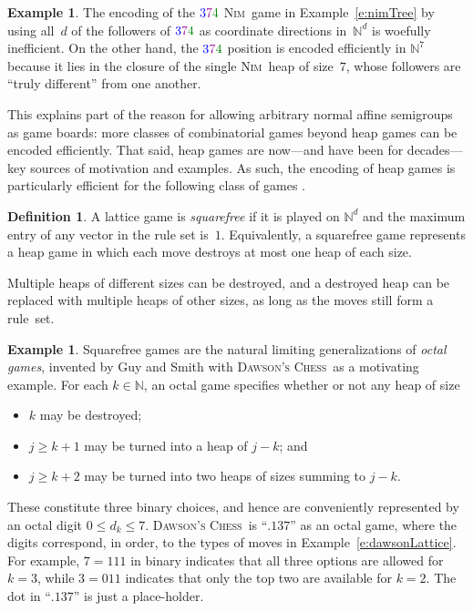\documentclass[12pt]{amsart}
\numberwithin{equation}{section}
\theoremstyle{definition}
\newtheorem{defn}[thm]{Definition}
\newtheorem{example}[thm]{Example}
\begin{document}
\begin{example}
The encoding of the
${\color{blue}3}{\color{darkpurple}7}{\color{darkgreen}4}$
{\textsc{Nim}}\ game in Example~\ref{e:nimTree} by using all~$d$ of the
followers of
${\color{blue}3}{\color{darkpurple}7}{\color{darkgreen}4}$ as
coordinate directions in~${\mathbb{N}}^d$ is woefully inefficient.  On
the other hand, the
${\color{blue}3}{\color{darkpurple}7}{\color{darkgreen}4}$
position is encoded efficiently in ${\mathbb{N}}^7$ because it lies in
the closure of the single {\textsc{Nim}}\ heap of size~$7$, whose
followers are ``truly different'' from one another.
\end{example}

This explains part of the reason for allowing arbitrary normal affine
semigroups as game boards: more classes of combinatorial games beyond
heap games can be encoded efficiently.  That said, heap games are
now---and have been for decades---key sources of motivation and
examples.  As such, the encoding of heap games is particularly
efficient for the following class of games
\cite[\S6--\S7]{latticeGames}.

\begin{defn}
A lattice game is \emph{squarefree} if it is played on ${\mathbb{N}}^d$ and the
maximum entry of any vector in the rule set is~$1$.  Equivalently, a
squarefree game represents a heap game in which each move destroys at
most one heap of each size.
\end{defn}

Multiple heaps of different sizes can be destroyed, and a destroyed
heap can be replaced with multiple heaps of other sizes, as long as
the moves still form a rule~set.

\begin{example}\label{e:octal}
Squarefree games are the natural limiting generalizations of
\emph{octal games}, invented by Guy and Smith \cite{gvalues} with
{\textsc{Dawson's Chess}}\ as a motivating example.  For each $k \in {\mathbb{N}}$, an octal game
specifies whether or not any heap of size
\begin{itemize}
\item$k$ may be destroyed;
\item$j \geq k + 1$ may be turned into a heap of $j - k$; and
\item$j \geq k + 2$ may be turned into two heaps of sizes summing to $j-k$.
\end{itemize}
These constitute three binary choices, and hence are conveniently
represented by an octal digit $0 \leq d_k \leq 7$.  {\textsc{Dawson's Chess}}\ is
``$.137$'' as an octal game, where the digits correspond, in order, to
the types of moves in Example~\ref{e:dawsonLattice}.  For example, $7
= 111$ in binary indicates that all three options are allowed for $k =
3$, while $3 = 011$ indicates that only the top two are available for
$k = 2$.  The dot in ``$.137$'' is just a place-holder.
\end{example}
\end{document}
